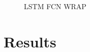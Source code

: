 \begin{figure}
	\centering
	\caption{LSTM FCN WRAP}
	\label{fig:nn2}
\end{figure}


\section{Results}
\label{sec:imp:results}
